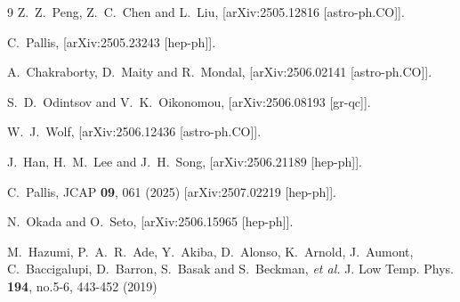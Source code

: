 \documentclass[aps,prev,twocolumn,preprintnumbers,floatfix,nofootinbib]{revtex4-1}
\begin{document}
\begin{thebibliography}{9}
Z.~Z.~Peng, Z.~C.~Chen and L.~Liu,
[arXiv:2505.12816 [astro-ph.CO]].


C.~Pallis,
[arXiv:2505.23243 [hep-ph]].


A.~Chakraborty, D.~Maity and R.~Mondal,
[arXiv:2506.02141 [astro-ph.CO]].


S.~D.~Odintsov and V.~K.~Oikonomou,
[arXiv:2506.08193 [gr-qc]].

W.~J.~Wolf,
[arXiv:2506.12436 [astro-ph.CO]].

J.~Han, H.~M.~Lee and J.~H.~Song,
[arXiv:2506.21189 [hep-ph]].


C.~Pallis,
JCAP \textbf{09}, 061 (2025)
[arXiv:2507.02219 [hep-ph]].

N.~Okada and O.~Seto,
[arXiv:2506.15965 [hep-ph]].

M.~Hazumi, P.~A.~R.~Ade, Y.~Akiba, D.~Alonso, K.~Arnold, J.~Aumont, C.~Baccigalupi, D.~Barron, S.~Basak and S.~Beckman, \textit{et al.}
J. Low Temp. Phys. \textbf{194}, no.5-6, 443-452 (2019)



\end{thebibliography}
\end{document}
